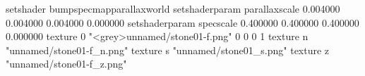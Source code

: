 setshader bumpspecmapparallaxworld
setshaderparam parallaxscale 0.004000 0.004000 0.004000 0.000000
setshaderparam specscale 0.400000 0.400000 0.400000 0.000000
texture 0 "<grey>unnamed/stone01-f.png" 0 0 0 1
texture n "unnamed/stone01-f_n.png"
texture s "unnamed/stone01_s.png"
texture z "unnamed/stone01-f_z.png"